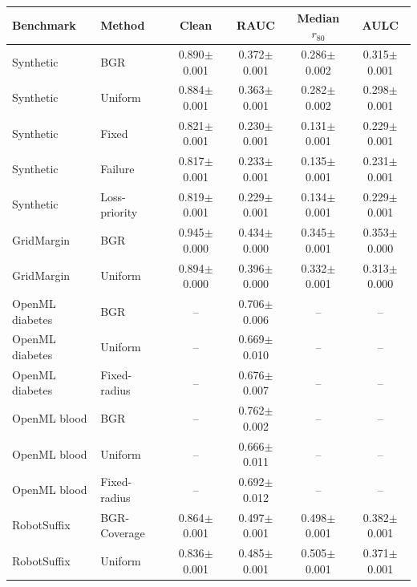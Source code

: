 \begin{tabular}{llcccc}
\hline
Benchmark & Method & Clean & RAUC & Median $r_{80}$ & AULC \\
\hline
Synthetic & BGR & 0.890$\pm$0.001 & 0.372$\pm$0.001 & 0.286$\pm$0.002 & 0.315$\pm$0.001 \\
Synthetic & Uniform & 0.884$\pm$0.001 & 0.363$\pm$0.001 & 0.282$\pm$0.002 & 0.298$\pm$0.001 \\
Synthetic & Fixed & 0.821$\pm$0.001 & 0.230$\pm$0.001 & 0.131$\pm$0.001 & 0.229$\pm$0.001 \\
Synthetic & Failure & 0.817$\pm$0.001 & 0.233$\pm$0.001 & 0.135$\pm$0.001 & 0.231$\pm$0.001 \\
Synthetic & Loss-priority & 0.819$\pm$0.001 & 0.229$\pm$0.001 & 0.134$\pm$0.001 & 0.229$\pm$0.001 \\
GridMargin & BGR & 0.945$\pm$0.000 & 0.434$\pm$0.000 & 0.345$\pm$0.001 & 0.353$\pm$0.000 \\
GridMargin & Uniform & 0.894$\pm$0.000 & 0.396$\pm$0.000 & 0.332$\pm$0.001 & 0.313$\pm$0.000 \\
OpenML diabetes & BGR & -- & 0.706$\pm$0.006 & -- & -- \\
OpenML diabetes & Uniform & -- & 0.669$\pm$0.010 & -- & -- \\
OpenML diabetes & Fixed-radius & -- & 0.676$\pm$0.007 & -- & -- \\
OpenML blood & BGR & -- & 0.762$\pm$0.002 & -- & -- \\
OpenML blood & Uniform & -- & 0.666$\pm$0.011 & -- & -- \\
OpenML blood & Fixed-radius & -- & 0.692$\pm$0.012 & -- & -- \\
RobotSuffix & BGR-Coverage & 0.864$\pm$0.001 & 0.497$\pm$0.001 & 0.498$\pm$0.001 & 0.382$\pm$0.001 \\
RobotSuffix & Uniform & 0.836$\pm$0.001 & 0.485$\pm$0.001 & 0.505$\pm$0.001 & 0.371$\pm$0.001 \\
\hline
\end{tabular}
